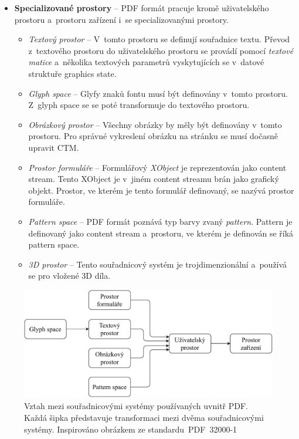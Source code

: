 \begin{itemize}
    \item \textbf{Specializované prostory} -- PDF formát pracuje kromě
    uživatelského prostoru a~prostoru zařízení i~se specializovanými prostory.
    \begin{itemize}
        \item \emph{Textový prostor} -- V~tomto prostoru se definují souřadnice
        textu. Převod z~textového prostoru do uživatelského prostoru se provádí
        pomocí \emph{textové matice} a~několika textových parametrů vyskytujících
        se v~datové struktuře graphics state.

        \item \emph{Glyph space} -- Glyfy znaků fontu musí být definovány v~tomto
        prostoru. Z~glyph space se se poté transformuje do textového prostoru.
        
        \item \emph{Obrázkový prostor} -- Všechny obrázky by měly být definovány
        v~tomto prostoru. Pro správné vykreslení obrázku na stránku se musí dočasně
        upravit CTM.

        \item \emph{Prostor formuláře} -- Formulářový \emph{XObject} je
        reprezentován jako content stream. Tento XObject je v~jiném content streamu
        brán jako grafický objekt. Prostor, ve kterém je tento formulář definovaný,
        se nazývá prostor formuláře.

        \item \emph{Pattern space} -- PDF formát poznává typ barvy zvaný
        \emph{pattern}. Pattern je definovaný jako content stream a~prostoru, ve
        kterém je definován se říká pattern space.
        
        \item \emph{3D prostor} -- Tento souřadnicový systém je
        trojdimenzionální a~používá se pro vložené 3D díla.
    \end{itemize}
\end{itemize}

\begin{figure}[H]
    \label{coordinate_spaces}
    \includegraphics[width=\linewidth]{obrazky-figures/coordinate_spaces.pdf}
    \caption[Vztah mezi souřadnicovými systémy používaných uvnitř PDF]{Vztah mezi souřadnicovými systémy používaných uvnitř PDF. Každá šipka představuje transformaci mezi dvěma souřadnicovými systémy. Inspirováno obrázkem ze standardu~PDF~32000-1~\cite{PDF32000-1:2008}}
\end{figure}


